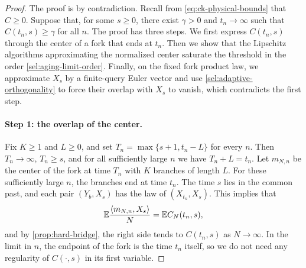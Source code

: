 \begin{proof}
The proof is by contradiction. Recall from \eqref{eq:ck-physical-bounds}
that $C\ge0$. Suppose that, for some $s\ge0$, there exist
$\gamma>0$ and $t_n\to\infty$ such that $C(t_n,s)\ge\gamma$ for all $n$. The
proof has three steps. We first express $C(t_n,s)$ through the center of a
fork that ends at $t_n$. Then we show that the Lipschitz algorithms
approximating the normalized center saturate the threshold in the order
\eqref{sel:aging-limit-order}. Finally, on the fixed fork product law, we approximate $X_s$ by a
finite-query Euler vector and use \cref{sel:adaptive-orthogonality} to force
their overlap with $X_s$ to vanish, which contradicts the first step.

\paragraph{Step 1: the overlap of the center.}
Fix $K\ge1$ and $L\ge0$, and set $T_n=\max\{s+1,t_n-L\}$ for every $n$.
Then $T_n\to\infty$, $T_n\ge s$, and for all sufficiently large $n$ we have
$T_n+L=t_n$. Let $m_{N,n}$ be the center of the fork at time $T_n$ with $K$
branches of length $L$. For these sufficiently large $n$, the branches
end at time $t_n$. The time $s$ lies in the common past,
and each pair $(Y_b,X_s)$ has the law of $(X_{t_n},X_s)$. This implies that
\begin{equation}\label{sel:fork-fixed-wait-overlap}
 \mathbb E\frac{\left\langle m_{N,n},X_s\right\rangle}N=\mathbb E C_N(t_n,s),
\end{equation}
and by \cref{prop:hard-bridge}, the right side tends to $C(t_n,s)$ as
$N\to\infty$. In the limit in $n$, the endpoint of the fork is the time $t_n$ itself,
so we do not need any regularity of $C(\cdot,s)$ in its first variable.


\end{proof}

